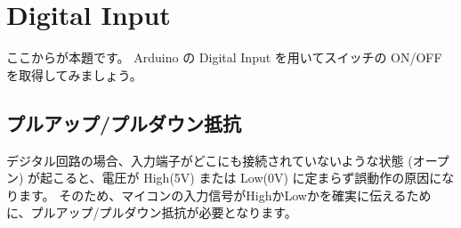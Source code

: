\documentclass[11pt,a4paper]{jarticle}
\begin{document}
\section{Digital Input}
ここからが本題です。
Arduino の Digital Input を用いてスイッチの ON/OFF を取得してみましょう。


\subsection*{プルアップ/プルダウン抵抗}
デジタル回路の場合、入力端子がどこにも接続されていないような状態 (オープン) が起こると、電圧が High(5V) または Low(0V) に定まらず誤動作の原因になります。
そのため、マイコンの入力信号がHighかLowかを確実に伝えるために、プルアップ/プルダウン抵抗が必要となります。

\end{document}
